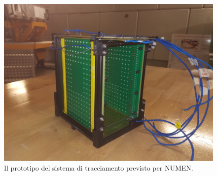 \begin{figure} [!t]
	\centering
	\includegraphics[width=\textwidth, keepaspectratio]{Grafici/castelletto3.jpg}
	\caption{Il prototipo del sistema di tracciamento previsto per NUMEN.} \label{fig:castelletto}
\end{figure}



\section{}




